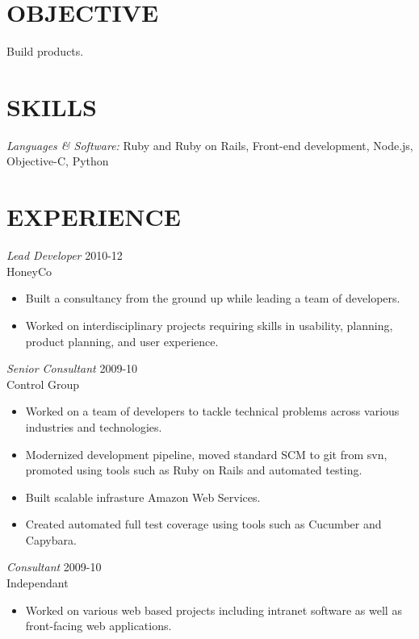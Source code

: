 \documentclass[line,margin]{res}
\begin{document}
\address{345 Eldert St. Apt. 314}
\address{(641) 233-1123}


\begin{resume}

\section{OBJECTIVE}
    Build products.


\section{SKILLS} {\sl Languages \& Software:}
    Ruby and Ruby on Rails, Front-end development,
    Node.js, Objective-C, Python

\section{EXPERIENCE}
    {\sl Lead Developer}
    \hfill 2010-12 \\
    HoneyCo
    \begin{itemize} \itemsep -2pt
        \item
            Built a consultancy from the ground up while leading
            a team of developers.
        \item
            Worked on interdisciplinary projects requiring skills in
            usability, planning, product planning, and user experience.
    \end{itemize}

    {\sl Senior Consultant}
    \hfill 2009-10 \\
    Control Group
    \begin{itemize} \itemsep -2pt
        \item
            Worked on a team of developers to tackle technical problems across
            various industries and technologies.
        \item
            Modernized development pipeline, moved standard SCM to git from svn,
            promoted using tools such as Ruby on Rails and automated testing.
        \item
            Built scalable infrasture Amazon Web Services.
        \item
            Created automated full test coverage using tools such as Cucumber and
            Capybara.
    \end{itemize}

    {\sl Consultant}
    \hfill 2009-10 \\
    Independant
    \begin{itemize} \itemsep -2pt
        \item
            Worked on various web based projects including intranet software as well
            as front-facing web applications.
    \end{itemize}


\end{resume}
\end{document}
